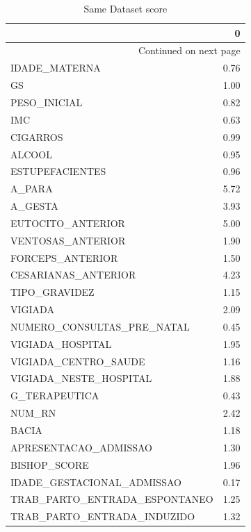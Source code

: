 \documentclass{article}
\begin{document}
\begin{longtable}{lr}
\caption{Same Dataset score}\label{tab:samedatascore}\\
\toprule
{} &     0 \\
\midrule
\endhead
\midrule
\multicolumn{2}{r}{{Continued on next page}} \\
\midrule
\endfoot

\bottomrule
\endlastfoot
IDADE\_MATERNA                 &  0.76 \\
GS                            &  1.00 \\
PESO\_INICIAL                  &  0.82 \\
IMC                           &  0.63 \\
CIGARROS                      &  0.99 \\
ALCOOL                        &  0.95 \\
ESTUPEFACIENTES               &  0.96 \\
A\_PARA                        &  5.72 \\
A\_GESTA                       &  3.93 \\
EUTOCITO\_ANTERIOR             &  5.00 \\
VENTOSAS\_ANTERIOR             &  1.90 \\
FORCEPS\_ANTERIOR              &  1.50 \\
CESARIANAS\_ANTERIOR           &  4.23 \\
TIPO\_GRAVIDEZ                 &  1.15 \\
VIGIADA                       &  2.09 \\
NUMERO\_CONSULTAS\_PRE\_NATAL    &  0.45 \\
VIGIADA\_HOSPITAL              &  1.95 \\
VIGIADA\_CENTRO\_SAUDE          &  1.16 \\
VIGIADA\_NESTE\_HOSPITAL        &  1.88 \\
G\_TERAPEUTICA                 &  0.43 \\
NUM\_RN                        &  2.42 \\
BACIA                         &  1.18 \\
APRESENTACAO\_ADMISSAO         &  1.30 \\
BISHOP\_SCORE                  &  1.96 \\
IDADE\_GESTACIONAL\_ADMISSAO    &  0.17 \\
TRAB\_PARTO\_ENTRADA\_ESPONTANEO &  1.25 \\
TRAB\_PARTO\_ENTRADA\_INDUZIDO   &  1.32 \\

\end{longtable}
\end{document}
